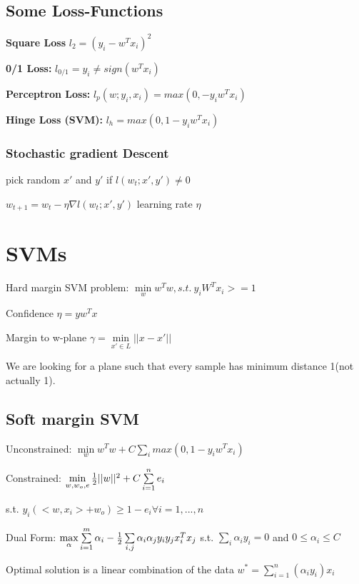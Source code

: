 \documentclass[11pt,twocolumn]{article}
\begin{document}
\subsection{Some Loss-Functions}
\textbf{Square Loss} $l_2 = (y_i - w^T x_i)^2$

\textbf{0/1 Loss:} $ l_{0/1}  =  y_i \neq sign(w^Tx_i)$

\textbf{Perceptron Loss:} $l_p\left(w;y_i,x_i \right) =   max(0, -y_i w^T x_i)$

\textbf{Hinge Loss (SVM):} $l_h =   max(0, 1 -y_i w^T x_i)$

\subsubsection{Stochastic gradient Descent}
pick random $x'$ and $y'$
if $ l(w_t;x',y') \neq 0$

$w_{t+1} = w_{t} - \eta \nabla l(w_t;x', y') $  learning rate $\eta$



\section{SVMs}
Hard margin SVM problem: $\min \limits_w w^Tw , s.t.~ y_i W^T x_i >= 1$



Confidence $\eta = y w^T x$

Margin to w-plane $\gamma = \min \limits_{x' \in L} ||x-x'|| $

We are looking for a plane such that every sample has minimum distance 1(not actually 1).


\subsection{Soft margin SVM}

Unconstrained: $\min \limits_w w^Tw + C \sum \limits_i max\left(0, 1-y_iw^Tx_i\right)$


Constrained: $\min \limits_{w,w_o, e} {{1 \over 2} ||w||^2 + C \sum \limits_{i=1}^n {e_i}}$ 

s.t. $ y_i \left( <w, x_i> + w_o \right) \geq 1 - e_i \forall i = 1,...,n$


Dual Form: $ \max \limits_{\alpha} \sum \limits_{i=1}^m \alpha_i - {1 \over 2} \sum \limits_{i,j} \alpha_i \alpha_j y_i y_j x_i^T x_j$ s.t. $\sum \limits_i \alpha_i y_i  = 0$ and $0 \leq \alpha_i \leq C$


Optimal solution is a linear combination of the data $w^* = \sum \limits_{i=1}^n \left( \alpha_i y_i \right) x_i$
\end{document}
